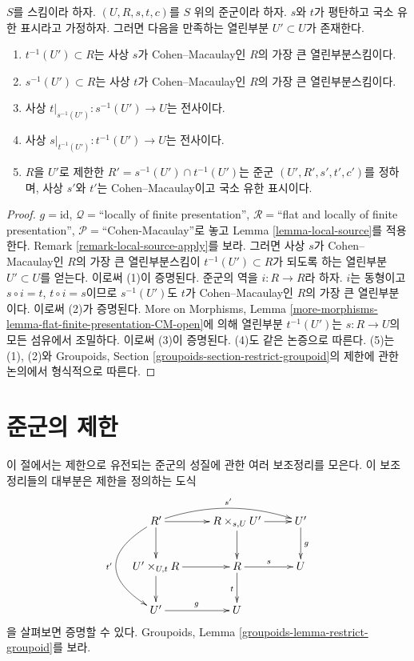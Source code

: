 \begin{lemma}
\label{lemma-make-CM}
$S$를 스킴이라 하자.
$(U, R, s, t, c)$를 $S$ 위의 준군이라 하자.
$s$와 $t$가 평탄하고 국소 유한 표시라고 가정하자.
그러면 다음을 만족하는 열린부분 $U' \subset U$가 존재한다.
\begin{enumerate}
\item $t^{-1}(U') \subset R$는 사상 $s$가 Cohen--Macaulay인
$R$의 가장 큰 열린부분스킴이다.
\item $s^{-1}(U') \subset R$는 사상 $t$가 Cohen--Macaulay인
$R$의 가장 큰 열린부분스킴이다.
\item 사상 $t|_{s^{-1}(U')} : s^{-1}(U') \to U$는 전사이다.
\item 사상 $s|_{t^{-1}(U')} : t^{-1}(U') \to U$는 전사이다.
\item $R$을 $U'$로 제한한 $R' = s^{-1}(U') \cap t^{-1}(U')$는
준군 $(U', R', s', t', c')$를 정하며, 사상 $s'$와 $t'$는
Cohen--Macaulay이고 국소 유한 표시이다.
\end{enumerate}
\end{lemma}

\begin{proof}
$g = \text{id}$,
$\mathcal{Q} =$``locally of finite presentation'',
$\mathcal{R} =$``flat and locally of finite presentation'',
$\mathcal{P}=$``Cohen-Macaulay''로 놓고 Lemma
\ref{lemma-local-source}를 적용한다. Remark
\ref{remark-local-source-apply}를 보라.
그러면 사상 $s$가 Cohen--Macaulay인 $R$의 가장 큰 열린부분스킴이
$t^{-1}(U') \subset R$가 되도록 하는 열린부분 $U' \subset U$를 얻는다.
이로써 (1)이 증명된다. 준군의 역을 $i : R \to R$라 하자.
$i$는 동형이고 $s \circ i = t$, $t \circ i = s$이므로
$s^{-1}(U')$도 $t$가 Cohen--Macaulay인 $R$의 가장 큰 열린부분이다.
이로써 (2)가 증명된다. More on Morphisms, Lemma
\ref{more-morphisms-lemma-flat-finite-presentation-CM-open}에 의해
열린부분 $t^{-1}(U')$는 $s : R \to U$의 모든 섬유에서 조밀하다.
이로써 (3)이 증명된다. (4)도 같은 논증으로 따른다.
(5)는 (1), (2)와 Groupoids, Section
\ref{groupoids-section-restrict-groupoid}의 제한에 관한 논의에서
형식적으로 따른다.
\end{proof}








\section{준군의 제한}
\label{section-restricting-groupoids}

\noindent
이 절에서는 제한으로 유전되는 준군의 성질에 관한 여러 보조정리를 모은다.
이 보조정리들의 대부분은 제한을 정의하는 도식
\begin{equation}
\label{equation-restriction}
\vcenter{
\xymatrix{
R' \ar[d] \ar[r] \ar@/_3pc/[dd]_{t'} \ar@/^1pc/[rr]^{s'}&
R \times_{s, U} U' \ar[r] \ar[d] &
U' \ar[d]^g \\
U' \times_{U, t} R \ar[d] \ar[r] &
R \ar[r]^s \ar[d]_t &
U \\
U' \ar[r]^g &
U
}
}
\end{equation}
을 살펴보면 증명할 수 있다. Groupoids, Lemma
\ref{groupoids-lemma-restrict-groupoid}를 보라.

